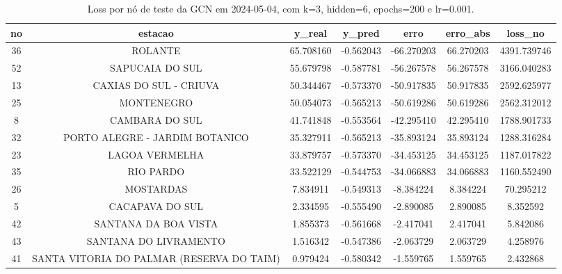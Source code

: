\begin{table}[h]
\centering
\caption{Loss por nó de teste da GCN em 2024-05-04, com k=3, hidden=6, epochs=200 e lr=0.001.}
\label{tab:gcn_loss_nodes_k3_hidden6}
\begin{tabular}{ccccccc}
\toprule
no & estacao & y\_real & y\_pred & erro & erro\_abs & loss\_no \\
\midrule
36 & ROLANTE & 65.708160 & -0.562043 & -66.270203 & 66.270203 & 4391.739746 \\
52 & SAPUCAIA DO SUL & 55.679798 & -0.587781 & -56.267578 & 56.267578 & 3166.040283 \\
13 & CAXIAS DO SUL - CRIUVA & 50.344467 & -0.573370 & -50.917835 & 50.917835 & 2592.625977 \\
25 & MONTENEGRO & 50.054073 & -0.565213 & -50.619286 & 50.619286 & 2562.312012 \\
8 & CAMBARA DO SUL & 41.741848 & -0.553564 & -42.295410 & 42.295410 & 1788.901733 \\
32 & PORTO ALEGRE - JARDIM BOTANICO & 35.327911 & -0.565213 & -35.893124 & 35.893124 & 1288.316284 \\
23 & LAGOA VERMELHA & 33.879757 & -0.573370 & -34.453125 & 34.453125 & 1187.017822 \\
35 & RIO PARDO & 33.522129 & -0.544753 & -34.066883 & 34.066883 & 1160.552490 \\
26 & MOSTARDAS & 7.834911 & -0.549313 & -8.384224 & 8.384224 & 70.295212 \\
5 & CACAPAVA DO SUL & 2.334595 & -0.555490 & -2.890085 & 2.890085 & 8.352592 \\
42 & SANTANA DA BOA VISTA & 1.855373 & -0.561668 & -2.417041 & 2.417041 & 5.842086 \\
43 & SANTANA DO LIVRAMENTO & 1.516342 & -0.547386 & -2.063729 & 2.063729 & 4.258976 \\
41 & SANTA VITORIA DO PALMAR (RESERVA DO TAIM) & 0.979424 & -0.580342 & -1.559765 & 1.559765 & 2.432868 \\
\bottomrule
\end{tabular}
\end{table}
